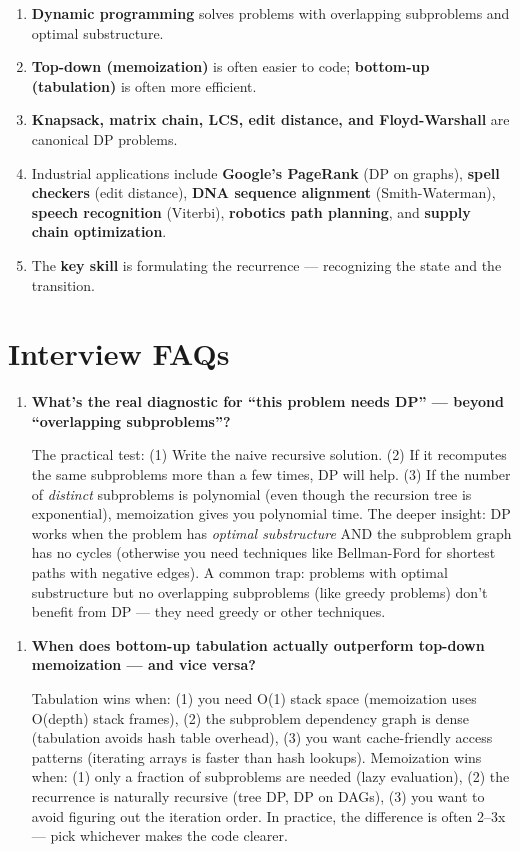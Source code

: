 \begin{enumerate}
\item \textbf{Dynamic programming} solves problems with overlapping subproblems and optimal substructure.
\item \textbf{Top-down (memoization)} is often easier to code; \textbf{bottom-up (tabulation)} is often more efficient.
\item \textbf{Knapsack, matrix chain, LCS, edit distance, and Floyd-Warshall} are canonical DP problems.
\item Industrial applications include \textbf{Google's PageRank} (DP on graphs), \textbf{spell checkers} (edit distance), \textbf{DNA sequence alignment} (Smith-Waterman), \textbf{speech recognition} (Viterbi), \textbf{robotics path planning}, and \textbf{supply chain optimization}.
\item The \textbf{key skill} is formulating the recurrence — recognizing the state and the transition.
\end{enumerate}

\section{Interview FAQs}

\begin{enumerate}
\item \textbf{What's the real diagnostic for ``this problem needs DP'' — beyond ``overlapping subproblems''?}\label{faq:dp-diagnostic}

The practical test: (1) Write the naive recursive solution. (2) If it recomputes the same subproblems more than a few times, DP will help. (3) If the number of \emph{distinct} subproblems is polynomial (even though the recursion tree is exponential), memoization gives you polynomial time. The deeper insight: DP works when the problem has \emph{optimal substructure} AND the subproblem graph has no cycles (otherwise you need techniques like Bellman-Ford for shortest paths with negative edges). A common trap: problems with optimal substructure but no overlapping subproblems (like greedy problems) don't benefit from DP — they need greedy or other techniques.
\end{enumerate}

\begin{enumerate}
\item \textbf{When does bottom-up tabulation actually outperform top-down memoization — and vice versa?}\label{faq:tab-vs-memo}

Tabulation wins when: (1) you need O(1) stack space (memoization uses O(depth) stack frames), (2) the subproblem dependency graph is dense (tabulation avoids hash table overhead), (3) you want cache-friendly access patterns (iterating arrays is faster than hash lookups). Memoization wins when: (1) only a fraction of subproblems are needed (lazy evaluation), (2) the recurrence is naturally recursive (tree DP, DP on DAGs), (3) you want to avoid figuring out the iteration order. In practice, the difference is often 2--3x — pick whichever makes the code clearer.
\end{enumerate}

